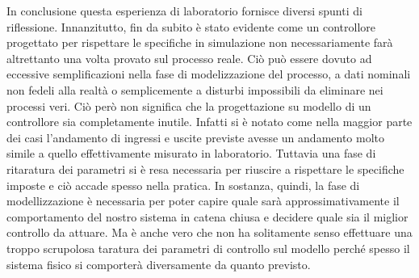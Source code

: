 		\noindent In conclusione questa esperienza di laboratorio fornisce diversi spunti di riflessione. Innanzitutto, fin da subito è stato evidente come un controllore progettato per rispettare le specifiche in simulazione non necessariamente farà altrettanto una volta provato sul processo reale. Ciò può essere dovuto ad eccessive semplificazioni nella fase di modelizzazione del processo, a dati nominali non fedeli alla realtà o semplicemente a disturbi impossibili da eliminare nei processi veri. Ciò però non significa che la progettazione su modello di un controllore sia completamente inutile. Infatti si è notato come nella maggior parte dei casi l’andamento di ingressi e uscite previste avesse un andamento molto simile a quello effettivamente misurato in laboratorio. Tuttavia una fase di ritaratura dei parametri si è resa necessaria per riuscire a rispettare le specifiche imposte e ciò accade spesso nella pratica. In sostanza, quindi, la fase di modellizzazione è necessaria per poter capire quale sarà approssimativamente il comportamento del nostro sistema in catena chiusa e decidere quale sia il miglior controllo da attuare. Ma è anche vero che non ha solitamente senso effettuare una troppo scrupolosa taratura dei parametri di controllo sul modello perché spesso il sistema fisico si comporterà diversamente da quanto previsto.   
		
		
		
		
		